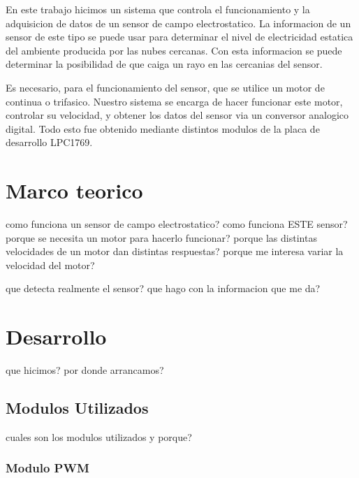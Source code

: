 \documentclass[a4paper]{article}
\begin{document}

En este trabajo hicimos un sistema que controla el funcionamiento y la adquisicion de datos de un sensor de campo electrostatico. La informacion de un sensor de este tipo se puede usar para determinar el nivel de electricidad estatica del ambiente producida por las nubes cercanas. Con esta informacion se puede determinar la posibilidad de que caiga un rayo en las cercanias del sensor.

Es necesario, para el funcionamiento del sensor, que se utilice un motor de continua o trifasico. Nuestro sistema se encarga de hacer funcionar este motor, controlar su velocidad, y obtener los datos del sensor via un conversor analogico digital. Todo esto fue obtenido mediante distintos modulos de la placa de desarrollo LPC1769. 


\section{Marco teorico} %
\label{sec:marco_teorico}

como funciona un sensor de campo electrostatico? como funciona ESTE sensor? porque se necesita un motor para hacerlo funcionar? porque las distintas velocidades de un motor dan distintas respuestas? porque me interesa variar la velocidad del motor? 

que detecta realmente el sensor? que hago con la informacion que me da?


\section{Desarrollo} %
\label{sec:desarrollo}

que hicimos? por donde arrancamos?


\subsection{Modulos Utilizados} %
\label{sub:modulos_utilizados}

cuales son los modulos utilizados y porque? 

\subsubsection{Modulo PWM} %
\label{ssub:modulo_pwm}
\end{document}
